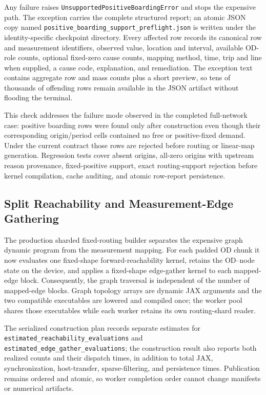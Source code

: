 Any failure raises
\texttt{UnsupportedPositiveBoardingError} and stops the expensive path.  The
exception carries the complete structured report; an atomic JSON copy named
\texttt{positive\_boarding\_support\_preflight.json} is written under the
identity-specific checkpoint directory.  Every affected row records its
canonical row and measurement identifiers, observed value, location and
interval, available OD-role counts, optional fixed-zero cause counts, mapping
method, time, trip and line when supplied, a cause code, explanation, and
remediation.  The exception text contains aggregate row and mass counts plus
a short preview, so tens of thousands of offending rows remain available in
the JSON artifact without flooding the terminal.

This check addresses the failure mode observed in the completed full-network
case: positive boarding rows were found only after construction even though
their corresponding origin/period cells contained no free or positive-fixed
demand.  Under the current contract those rows are rejected before routing or
linear-map generation.  Regression tests cover absent origins, all-zero
origins with upstream reason provenance, fixed-positive support, exact
routing-support rejection before kernel compilation, cache auditing, and
atomic row-report persistence.

\subsection{Split Reachability and Measurement-Edge Gathering}

The production sharded fixed-routing builder separates the expensive graph
dynamic program from the measurement mapping.  For each padded OD chunk it
now evaluates one fixed-shape forward-reachability kernel, retains the
OD--node state on the device, and applies a fixed-shape edge-gather kernel to
each mapped-edge block.  Consequently, the graph traversal is independent of
the number of mapped-edge blocks.  Graph topology arrays are dynamic JAX
arguments and the two compatible executables are lowered and compiled once;
the worker pool shares those executables while each worker retains its own
routing-shard reader.

The serialized construction plan records separate estimates for
\texttt{estimated\_reachability\allowbreak\_evaluations} and
\texttt{estimated\_edge\allowbreak\_gather\allowbreak\_evaluations}; the construction result also
reports both realized counts and their dispatch times, in addition to total
JAX, synchronization, host-transfer, sparse-filtering, and persistence
times.  Publication remains ordered and atomic, so worker completion order
cannot change manifests or numerical artifacts.

